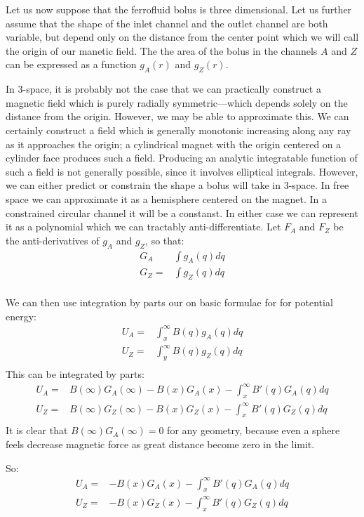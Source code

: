 \documentclass{asme2ej}
\begin{document}
Let us now suppose that the ferrofluid bolus is three dimensional.
Let us further assume that the shape of the inlet channel and
the outlet channel are both variable, but depend only on the distance
from the center point which we will call the origin of our manetic
field.
The the area of the bolus in the channels $A$ and $Z$ can be expressed
as a function $g_A(r)$ and $g_Z(r)$.

In 3-space, it is probably not the case that we can practically construct a
magnetic field which is purely radially symmetric---which depends solely on
the distance from the origin. However, we may be able to
approximate this. We can certainly construct a field which is
generally monotonic increasing along any ray as it approaches the origin;
a cylindrical magnet with the origin centered on a cylinder face produces
such a field. Producing an analytic integratable function of such
a field is not generally possible, since it involves elliptical integrals.
However, we can either predict or constrain the shape a bolus will take
in 3-space. In free space we can approximate it as a hemisphere centered
on the magnet. In a constrained circular channel it will be a constanst.
In either case we can represent it as a polynomial which we can
tractably anti-differentiate. Let $F_A$ and $F_Z$ be the anti-derivatives
of $g_A$ and $g_Z$, so that:
\begin{align}
  G_A &\int g_A(q) dq \\
  G_Z = & \int g_Z(q) dq \\
\end{align}

We can then use integration by parts our on basic formulae for
for potential energy:
\begin{align}
  U_A = &\int_x^\infty B(q) g_A(q) dq \\
  U_Z = & \int_y^\infty B(q) g_Z(q) dq \\
\end{align}
This can be integrated by parts:
\begin{align}
  U_A = & B(\infty) G_A(\infty) - B(x) G_A(x) - \int_x^\infty B'(q) G_A(q) dq \\
  U_Z = & B(\infty) G_Z(\infty) - B(x) G_Z(x) - \int_x^\infty B'(q) G_Z(q) dq \\
\end{align}
It is clear that $B(\infty) G_A(\infty) = 0$ for any geometry, because even a
sphere feels decrease magnetic force as great distance become zero in the limit.

So:
\begin{align}
  U_A = & - B(x) G_A(x) - \int_x^\infty B'(q) G_A(q) dq \\
  U_Z = & - B(x) G_Z(x) - \int_x^\infty B'(q) G_Z(q) dq \\
\end{align}
\end{document}
